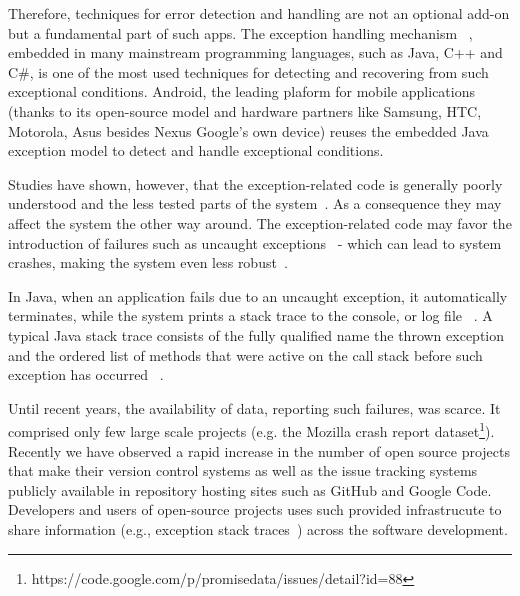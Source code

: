 \documentclass[conference]{IEEEtran}
\begin{document}
Therefore, techniques for error detection and handling are not  an optional add-on but a 
fundamental part of such apps. The exception handling mechanism ~\cite{goodenough1975exception},
embedded in many mainstream programming languages, such as Java, C++ and C\#,
 is one of the most used techniques for detecting and recovering from such exceptional conditions. 
Android, the leading plaform for mobile applications~\cite{gartner} (thanks to its open-source 
model and hardware partners like Samsung, HTC, Motorola, Asus besides Nexus Google's
 own device)  reuses the embedded Java exception model to detect and handle 
 exceptional conditions.

Studies have shown, however, that the exception-related code is generally poorly understood and the
 less tested parts of the system~\cite{miller1997issues,Robil00,shah2010understanding, 
garcia2007extracting,garcia2001comparative,cabral2007exception,coelho2011unveiling}.
As a consequence they may affect the system the other way around.
The exception-related code may favor the introduction of failures such as 
uncaught exceptions~\cite{jo2004uncaught, Zhang12} - 
which can lead to system crashes, making the system even less robust~\cite{coelho2011unveiling}.

In Java, when an application fails due to an uncaught exception, 
it automatically terminates, while the system prints a stack trace to the console, 
or log file ~\cite{gosling2000java}.  A typical Java stack trace consists of  the fully qualified name 
the thrown exception and the ordered list of methods that were active on the call stack before 
such exception has occurred ~\cite{gosling2000java,bloch2008effective}.

Until recent years, the availability of data, reporting such failures, was scarce. 
It comprised only few large scale projects (e.g. the Mozilla crash report dataset\footnote{https://code.google.com/p/promisedata/issues/detail?id=88}).
Recently we have observed a rapid increase in the number of open
source projects that make their version control systems as well as the issue tracking systems
publicly available in repository hosting sites such as GitHub and Google Code.
Developers and users of open-source projects uses such provided
 infrastrucute to share information (e.g., exception stack traces~\cite{bettenburg2008makes,schroter2010stack}) across 
the software development.

\end{document}
